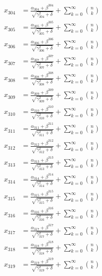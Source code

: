 \documentclass{article}
\begin{document}
\begin{align}
  x_{304} &= \frac{\alpha_{304} + \beta^{304}}{\sqrt{\gamma_{304}^2 + \delta}} + \sum_{k=0}^{\infty} \binom{n}{k} \label{eq:304} \\
  x_{305} &= \frac{\alpha_{305} + \beta^{305}}{\sqrt{\gamma_{305}^2 + \delta}} + \sum_{k=0}^{\infty} \binom{n}{k} \label{eq:305} \\
  x_{306} &= \frac{\alpha_{306} + \beta^{306}}{\sqrt{\gamma_{306}^2 + \delta}} + \sum_{k=0}^{\infty} \binom{n}{k} \label{eq:306} \\
  x_{307} &= \frac{\alpha_{307} + \beta^{307}}{\sqrt{\gamma_{307}^2 + \delta}} + \sum_{k=0}^{\infty} \binom{n}{k} \label{eq:307} \\
  x_{308} &= \frac{\alpha_{308} + \beta^{308}}{\sqrt{\gamma_{308}^2 + \delta}} + \sum_{k=0}^{\infty} \binom{n}{k} \label{eq:308} \\
  x_{309} &= \frac{\alpha_{309} + \beta^{309}}{\sqrt{\gamma_{309}^2 + \delta}} + \sum_{k=0}^{\infty} \binom{n}{k} \label{eq:309} \\
  x_{310} &= \frac{\alpha_{310} + \beta^{310}}{\sqrt{\gamma_{310}^2 + \delta}} + \sum_{k=0}^{\infty} \binom{n}{k} \label{eq:310} \\
  x_{311} &= \frac{\alpha_{311} + \beta^{311}}{\sqrt{\gamma_{311}^2 + \delta}} + \sum_{k=0}^{\infty} \binom{n}{k} \label{eq:311} \\
  x_{312} &= \frac{\alpha_{312} + \beta^{312}}{\sqrt{\gamma_{312}^2 + \delta}} + \sum_{k=0}^{\infty} \binom{n}{k} \label{eq:312} \\
  x_{313} &= \frac{\alpha_{313} + \beta^{313}}{\sqrt{\gamma_{313}^2 + \delta}} + \sum_{k=0}^{\infty} \binom{n}{k} \label{eq:313} \\
  x_{314} &= \frac{\alpha_{314} + \beta^{314}}{\sqrt{\gamma_{314}^2 + \delta}} + \sum_{k=0}^{\infty} \binom{n}{k} \label{eq:314} \\
  x_{315} &= \frac{\alpha_{315} + \beta^{315}}{\sqrt{\gamma_{315}^2 + \delta}} + \sum_{k=0}^{\infty} \binom{n}{k} \label{eq:315} \\
  x_{316} &= \frac{\alpha_{316} + \beta^{316}}{\sqrt{\gamma_{316}^2 + \delta}} + \sum_{k=0}^{\infty} \binom{n}{k} \label{eq:316} \\
  x_{317} &= \frac{\alpha_{317} + \beta^{317}}{\sqrt{\gamma_{317}^2 + \delta}} + \sum_{k=0}^{\infty} \binom{n}{k} \label{eq:317} \\
  x_{318} &= \frac{\alpha_{318} + \beta^{318}}{\sqrt{\gamma_{318}^2 + \delta}} + \sum_{k=0}^{\infty} \binom{n}{k} \label{eq:318} \\
  x_{319} &= \frac{\alpha_{319} + \beta^{319}}{\sqrt{\gamma_{319}^2 + \delta}} + \sum_{k=0}^{\infty} \binom{n}{k} \label{eq:319} \\

\end{align}
\end{document}
